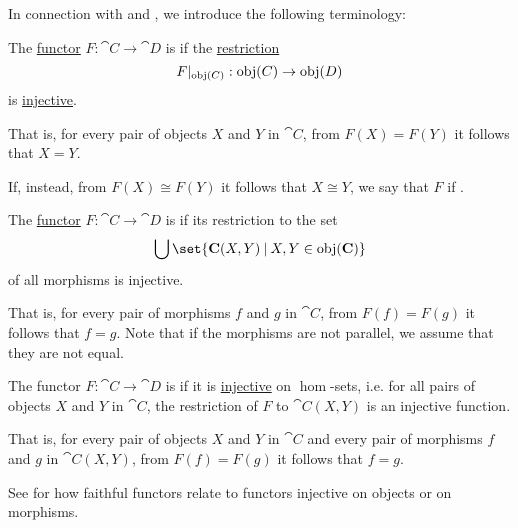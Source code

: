 \begin{definition}\label{def:functor_invertibility}
  In connection with  and , we introduce the following terminology:
  \begin{thmenum}
     The \hyperref[def:functor]{functor} \( F: \cat{C} \to \cat{D} \) is  if the \hyperref[def:multi_valued_function/restriction]{restriction}
    \begin{equation*}
      F\vert_{\operatorname{obj}(C)}: \operatorname{obj}(C) \to \operatorname{obj}(D)
    \end{equation*}
    is \hyperref[def:function_invertibility/injective]{injective}.

    That is, for every pair of objects \( X \) and \( Y \) in \( \cat{C} \), from \( F(X) = F(Y) \) it follows that \( X = Y \).

    If, instead, from \( F(X) \cong F(Y) \) it follows that \( X \cong Y \), we say that \( F \) if .

     The \hyperref[def:functor]{functor} \( F: \cat{C} \to \cat{D} \) is  if its restriction to the set
    \begin{equation*}
      \bigcup\set{ \cat{C}(X, Y) \given X, Y \in \obj(\cat{C}) }
    \end{equation*}
    of all morphisms is injective.

    That is, for every pair of morphisms \( f \) and \( g \) in \( \cat{C} \), from \( F(f) = F(g) \) it follows that \( f = g \). Note that if the morphisms are not parallel, we assume that they are not equal.

     The functor \( F: \cat{C} \to \cat{D} \) is  if it is \hyperref[def:function_invertibility/injective]{injective} on \( \hom \)-sets, i.e. for all pairs of objects \( X \) and \( Y \) in \( \cat{C} \), the restriction of \( F \) to \( \cat{C}(X, Y) \) is an injective function.

    That is, for every pair of objects \( X \) and \( Y \) in \( \cat{C} \) and every pair of morphisms \( f \) and \( g \) in \( \cat{C}(X, Y) \), from \( F(f) = F(g) \) it follows that \( f = g \).

    See  for how faithful functors relate to functors injective on objects or on morphisms.


\end{thmenum}
\end{definition}
